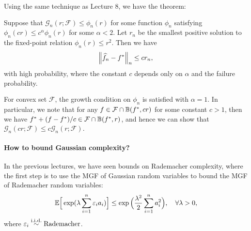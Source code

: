 \documentclass[11pt,letterpaper]{article}
\newcounter{lecture}
\numberwithin{theorem}{lecture}
\numberwithin{proposition}{lecture}
\numberwithin{lemma}{lecture}
\numberwithin{claim}{lecture}
\numberwithin{corollary}{lecture}
\numberwithin{definition}{lecture}
\numberwithin{conjecture}{lecture}
\numberwithin{remark}{lecture}
\numberwithin{example}{lecture}
\numberwithin{equation}{lecture}
\begin{document}
Using the same technique as Lecture 8, we have the theorem:
\begin{theorem}
  Suppose that $\mathcal{G}_n (r; \mathcal{F}) \leq \phi_n (r)$ for some function $\phi_n$ satisfying $\phi_n (c r) \leq c^\alpha \phi_n (r)$ for some $\alpha < 2$. Let $r_n$ be the smallest positive solution to the fixed-point relation $\phi_n (r) \leq r^2$. Then we have
  \begin{align*}
    \left\| \widehat{f}_n - f^*\right\|_{n} \leq c r_n,
  \end{align*}
  with high probability, where the constant $c$ depends only on $\alpha$ and the failure probability.
\end{theorem}
For convex set $\mathcal{F}$, the growth condition on $\phi_n$ is satisfied with $\alpha = 1$. In particular, we note that for any $f \in \mathcal{F} \cap \mathbb{B} (f^*, c r)$ for some constant $c > 1$, then we have $f^* + (f - f^*) / c \in \mathcal{F} \cap \mathbb{B} (f^*, r)$, and hence we can show that $\mathcal{G}_n (c r; \mathcal{F}) \leq c \mathcal{G}_n (r; \mathcal{F})$.

\paragraph{How to bound Gaussian complexity?} In the previous lectures, we have seen bounds on Rademacher complexity, where the first step is to use the MGF of Gaussian random variables to bound the MGF of Rademacher random variables:
\begin{align*}
  {\mathbb{E}} \Big[ \exp (\lambda \sum_{i = 1}^n \varepsilon_i a_i) \Big] \leq \exp \Big( \frac{\lambda^2}{2} \sum_{i = 1}^n a_i^2 \Big), \quad \forall \lambda > 0,
\end{align*}
where $\varepsilon_i \overset{\mathrm{i.i.d.}}{\sim} \mathrm{Rademacher}$.
\end{document}

